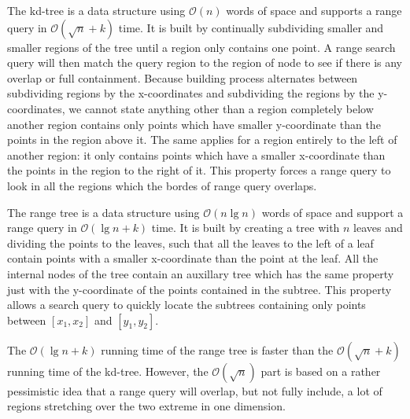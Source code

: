 The kd-tree is a data structure using $\mathcal{O}(n)$ words of space and supports a range query in $\mathcal{O}(\sqrt{n} + k)$ time. It is built by continually subdividing smaller and smaller regions of the tree until a region only contains one point. A range search query will then match the query region to the region of node to see if there is any overlap or full containment. Because building process alternates between subdividing regions by the x-coordinates and subdividing the regions by the y-coordinates, we cannot state anything other than a region completely below another region contains only points which have smaller y-coordinate than the points in the region above it. The same applies for a region entirely to the left of another region: it only contains points which have a smaller x-coordinate than the points in the region to the right of it. This property forces a range query to look in all the regions which the bordes of range query overlaps. 

The range tree is a data structure using $\mathcal{O}(n \lg n)$ words of space and support a range query in $\mathcal{O}(\lg n + k)$ time. It is built by creating a tree with $n$ leaves and dividing the points to the leaves, such that all the leaves to the left of a leaf contain points with a smaller x-coordinate than the point at the leaf. All the internal nodes of the tree contain an auxillary tree which has the same property just with the y-coordinate of the points contained in the subtree. This property allows a search query to quickly locate the subtrees containing only points between $[x_1, x_2]$ and $[y_1, y_2]$.

The $\mathcal{O}(\lg n + k)$ running time of the range tree is faster than the $\mathcal{O}(\sqrt{n} + k)$ running time of the kd-tree. However, the $\mathcal{O}(\sqrt{n})$ part is based on a rather pessimistic idea that a range query will overlap, but not fully include, a lot of regions stretching over the two extreme in one dimension.
